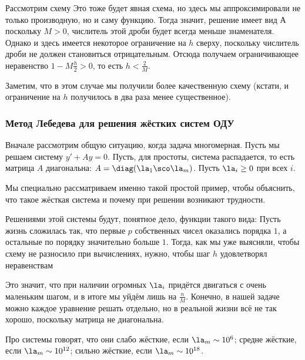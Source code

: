 \documentclass[a4paper]{article}
\begin{document}
\begin{ex}
Рассмотрим схему   Это тоже будет явная схема, но здесь мы аппроксимировали
не только производную, но и саму функцию. Тогда  значит, решение имеет вид
  А
поскольку $M > 0$, числитель этой дроби будет всегда меньше
знаменателя.  Однако и здесь имеется некоторое ограничение на $h$
сверху, поскольку числитель дроби не должен становиться
отрицательным. Отсюда получаем ограничивающее неравенство $1 - M
\frac{h}{2} > 0$, то есть $h < \frac{2}{M}$.

Заметим, что в этом случае мы получили более качественную схему
(кстати, и ограничение на $h$ получилось в два раза менее
существенное).
\end{ex}

\subsubsection{Метод Лебедева для решения жёстких систем ОДУ}

Вначале рассмотрим общую ситуацию, когда задача многомерная.  Пусть мы
решаем систему $y' + Ay = 0$. Пусть, для простоты, система
распадается, то есть матрица $A$ диагональна: $A = \diag (\la_1\sco
\la_m)$. Пусть $\la_i \ge 0$ при всех $i$.

\begin{note}
Мы специально рассматриваем именно такой простой пример, чтобы
объяснить, что такое жёсткая система и почему при решении возникают
трудности.
\end{note}

Решениями этой системы будут, понятное дело, функции такого вида:
  Пусть жизнь сложилась так, что
первые $p$ собственных чисел оказались порядка $1$, а остальные по
порядку значительно больше $1$. Тогда, как мы уже выясняли, чтобы
схему не разносило при вычислениях, нужно, чтобы шаг $h$ удовлетворял
неравенствам 

Это значит, что при наличии огромных $\la_i$ придётся двигаться с
очень маленьким шагом, и в итоге мы уйдём лишь на $\frac nM$.
Конечно, в нашей задаче можно каждое уравнение решать отдельно, но в
реальной жизни всё не так хорошо, поскольку матрица не диагональна.

Про системы говорят, что они слабо жёсткие, если $\la_m \sim 10^6$;
средне жёсткие, если $\la_m \sim 10^{12}$; сильно жёсткие, если $\la_m
\sim 10^{18}$.
\end{document}
